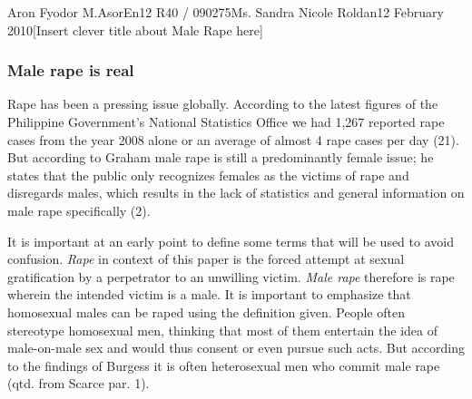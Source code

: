 \documentclass[12pt,letterpaper]{article}
\begin{document}
\begin{mla}{Aron Fyodor M.}{Asor}{En12 R40 / 090275}{Ms. Sandra Nicole Roldan}{12 February 2010}{[Insert clever title about Male Rape here]}

\subsubsection{Male rape is real}
%
%
\tab Rape has been a pressing issue globally. According to the latest figures of the Philippine Government's National Statistics Office we had 1,267 reported rape cases from the year 2008 alone or an average of almost 4 rape cases per day (21). But according to Graham male rape is still a predominantly female issue; he states that the public only recognizes females as the victims of rape and disregards males, which results in the lack of statistics and general information on male rape specifically (2).

%
%
It is important at an early point to define some terms that will be used to avoid confusion. \textit{Rape} in context of this paper is the forced attempt at sexual gratification by a perpetrator to an unwilling victim. \textit{Male rape} therefore is rape wherein the intended victim is a male. It is important to emphasize that homosexual males can  be raped using the definition given. People often stereotype homosexual men, thinking that most of them entertain the idea of male-on-male sex and would thus consent or even pursue such acts. But according to the findings of Burgess it is often heterosexual men who commit male rape (qtd. from Scarce par. 1).


\end{mla}
\end{document}
